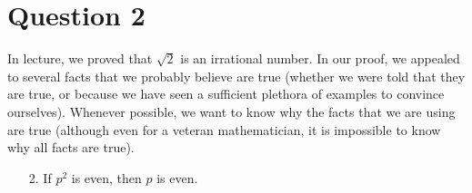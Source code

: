 \documentclass[12pt]{article}
\begin{document}
\section{Question 2}

In lecture, we proved that $\sqrt{2}$ is an irrational number. In our proof, we appealed
to several facts that we probably believe are true (whether we were told that they
are true, or because we have seen a sufficient plethora of examples to convince
ourselves). Whenever possible, we want to know why the facts that we are using
are true (although even for a veteran mathematician, it is impossible to know why
all facts are true).

\begin{itemize}
 \item[2.] If $p^2$ is even, then $p$ is even.
\end{itemize}
\end{document}
